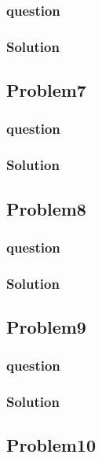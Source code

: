 \documentclass[journal,12pt,twocolumn]{IEEEtran}
\begin{document}
\subsubsection{question}

\subsubsection{Solution}


\subsection{Problem7}
\subsubsection{question}

\subsubsection{Solution}


\subsection{Problem8}
\subsubsection{question}

\subsubsection{Solution}


\subsection{Problem9}
\subsubsection{question}

\subsubsection{Solution}


\subsection{Problem10}
\end{document}
